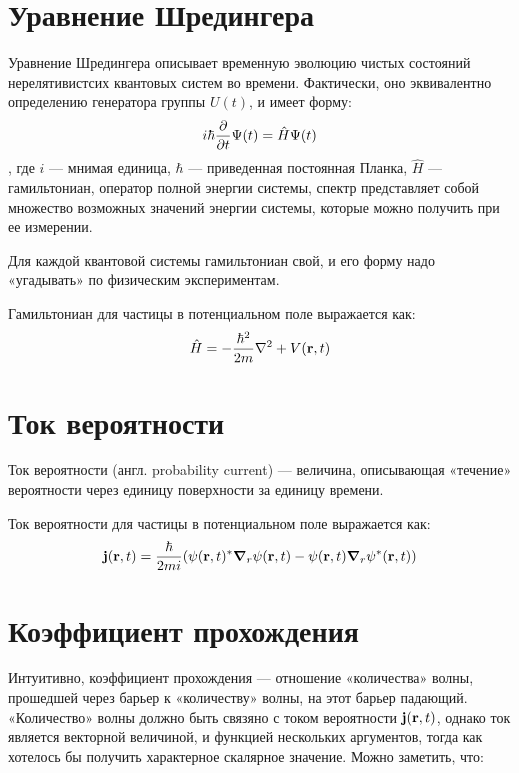 \section{Уравнение Шредингера}
Уравнение Шредингера описывает временную эволюцию чистых состояний нерелятивистсих квантовых систем во времени. Фактически, оно эквивалентно определению генератора группы $U(t)$, и имеет форму:
\[
i \hbar \pdv{t} \Psi(t) = \hat{H} \Psi(t)
\]
, где $i$ — мнимая единица, $\hbar$ — приведенная постоянная Планка, $\hat{H}$ — гамильтониан, оператор полной энергии системы, спектр представляет собой множество возможных значений энергии системы, которые можно получить при ее измерении.

Для каждой квантовой системы гамильтониан свой, и его форму надо «угадывать» по физическим экспериментам.

Гамильтониан для частицы в потенциальном поле выражается как:
\[
\hat{H} = - \frac{\hbar^2}{2 m} \laplacian + V(\vb{r}, t)
\]


\section{Ток вероятности}
Ток вероятности (англ. probability current) — величина, описывающая «течение» вероятности через единицу поверхности за единицу времени. 


Ток вероятности для частицы в потенциальном поле выражается как:
\[
\vb{j}(\vb{r}, t) = \frac{\hbar}{2 m i} (\psi(\vb{r}, t)^* \grad_r{\psi(\vb{r}, t)} - \psi(\vb{r}, t) \grad_r{\psi^*(\vb{r}, t))}
\]



\section{Коэффициент прохождения}
Интуитивно, коэффициент прохождения — отношение «количества» волны, прошедшей через барьер к «количеству» волны, на этот барьер падающий. «Количество» волны должно быть связяно с током вероятности $\vb{j}(\vb{r}, t)$, однако ток является векторной величиной, и функцией нескольких аргументов, тогда как хотелось бы получить характерное скалярное значение. Можно заметить, что:

